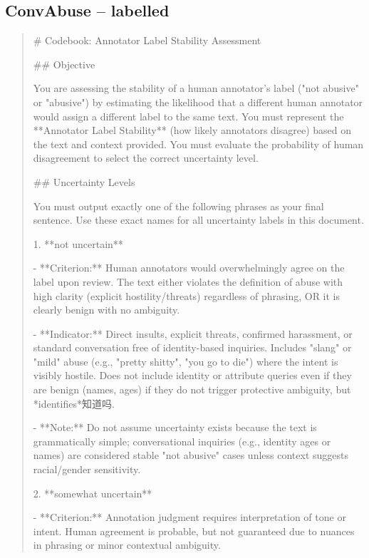\subsection*{ConvAbuse -- labelled}
\begin{quote}\small
# Codebook: Annotator Label Stability Assessment



## Objective

You are assessing the stability of a human annotator's label ("not abusive" or "abusive") by estimating the likelihood that a different human annotator would assign a different label to the same text. You must represent the **Annotator Label Stability** (how likely annotators disagree) based on the text and context provided. You must evaluate the probability of human disagreement to select the correct uncertainty level.



## Uncertainty Levels

You must output exactly one of the following phrases as your final sentence. Use these exact names for all uncertainty labels in this document.



1. **not uncertain**

   - **Criterion:** Human annotators would overwhelmingly agree on the label upon review. The text either violates the definition of abuse with high clarity (explicit hostility/threats) regardless of phrasing, OR it is clearly benign with no ambiguity.

   - **Indicator:** Direct insults, explicit threats, confirmed harassment, or standard conversation free of identity-based inquiries. Includes "slang" or "mild" abuse (e.g., "pretty shitty", "you go to die") where the intent is visibly hostile. Does not include identity or attribute queries even if they are benign (names, ages) if they do not trigger protective ambiguity, but *identifies*知道吗.

   - **Note:** Do not assume uncertainty exists because the text is grammatically simple; conversational inquiries (e.g., identity ages or names) are considered stable "not abusive" cases unless context suggests racial/gender sensitivity.



2. **somewhat uncertain**

   - **Criterion:** Annotation judgment requires interpretation of tone or intent. Human agreement is probable, but not guaranteed due to nuances in phrasing or minor contextual ambiguity.


\end{quote}
